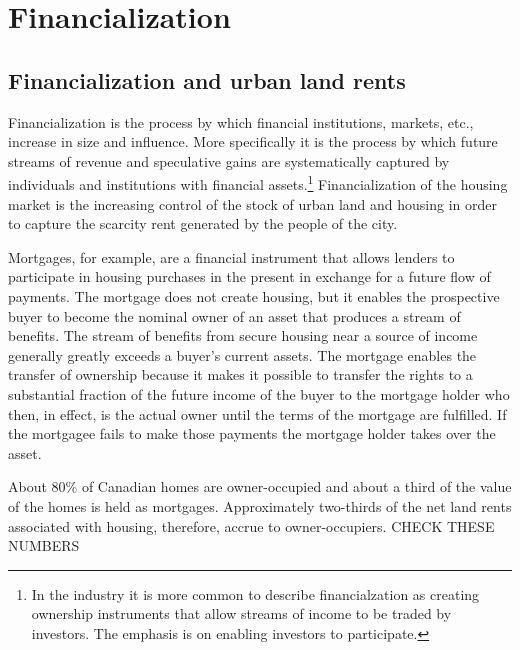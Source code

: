\chapter{Financialization} \label{chapter-financialization}

\section{Financialization and urban land rents}

Financialization is the process by which financial institutions, markets, etc., increase in size and influence. More specifically it is the process by which future streams of revenue and speculative gains are systematically captured by individuals and institutions with financial assets.\footnote{In the industry it is more common to describe financialzation as creating ownership instruments that allow streams of income to be traded by investors. The emphasis is on enabling investors to participate.} Financialization of the housing market is the increasing control of the stock of urban land and housing in order to capture the scarcity rent generated by the people of the city.  

Mortgages, for example, are a financial instrument that allows lenders to  participate in housing purchases in the present in exchange for a future flow of payments.  The mortgage does not create housing, but it enables the prospective buyer to become the nominal owner of an asset that produces a stream of benefits. The stream of benefits from secure housing near a source of income generally greatly exceeds a buyer's current assets. The mortgage enables the  transfer of ownership because it makes it possible to transfer the rights to a substantial fraction of the future income of the buyer to the mortgage holder who then, in effect, is the actual owner until the terms of the mortgage are fulfilled.  If the mortgagee fails to make those payments the mortgage holder takes over the asset. 

About 80\% of Canadian homes are owner-occupied and about a third of the  value of the homes is held as mortgages. Approximately two-thirds of the net land rents associated with housing, therefore, accrue to owner-occupiers. {\color {red}CHECK THESE NUMBERS } 


